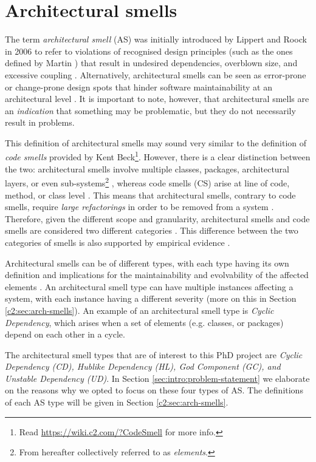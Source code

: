 \section{Architectural smells}
The term \emph{architectural smell} (AS) was initially introduced by Lippert and Roock in 2006 \cite{Lippert2006} to refer to violations of recognised design principles (such as the ones defined by Martin \cite{Martin2018}) that result in undesired dependencies, overblown size, and excessive coupling \cite{Garcia2009}.
Alternatively, architectural smells can be seen as error-prone or change-prone design spots that hinder software maintainability at an architectural level \cite{Mo2015}.
It is important to note, however, that architectural smells are an \emph{indication} that something may be problematic, but they do not necessarily result in problems.

This definition of architectural smells may sound very similar to the definition of \emph{code smells} provided by Kent Beck\footnote{Read \url{https://wiki.c2.com/?CodeSmell} for more info.}. 
However, there is a clear distinction between the two: architectural smells involve multiple classes, packages, architectural layers, or even sub-systems\footnote{From hereafter collectively referred to as \emph{elements}.} \cite{Lippert2006}, whereas code smells (CS) arise at line of code, method, or class level \cite{Fowler2002}. 
This means that architectural smells, contrary to code smells, require \emph{large refactorings} in order to be removed from a system \cite{Lippert2006}.
Therefore, given the different scope and granularity, architectural smells and code smells are considered two different categories \cite{Sharma2020}.
This difference between the two categories of smells is also supported by empirical evidence \cite{Arcelli2019}.

Architectural smells can be of different types, with each type having its own definition and implications for the maintainability and evolvability of the affected elements \cite{Azadi2019}.
An architectural smell type can have multiple instances affecting a system, with each instance having a different severity (more on this in Section \ref{c2:sec:arch-smells}).
An example of an architectural smell type is \emph{Cyclic Dependency}, which arises when a set of elements (e.g. classes, or packages) depend on each other in a cycle.

The architectural smell types that are of interest to this PhD project are \emph{Cyclic Dependency (CD), Hublike Dependency (HL), God Component (GC), and Unstable Dependency (UD)}.
In Section \ref{sec:intro:problem-statement} we elaborate on the reasons why we opted to focus on these four types of AS.
The definitions of each AS type will be given in Section \ref{c2:sec:arch-smells}.


